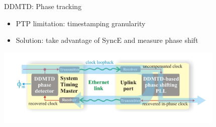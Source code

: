\documentclass[compress,red]{beamer}
\begin{document}
\begin{frame}{DDMTD: Phase tracking}

\small
    \begin{itemize}
      \item PTP limitation: timestamping granularity
      \item Solution: take advantage of SyncE and measure phase shift
    \end{itemize}

  \begin{center}
  \includegraphics[height=3.7cm]{misc/phase_tracking_v2.jpg}
  \end{center}

\end{frame}
\end{document}
